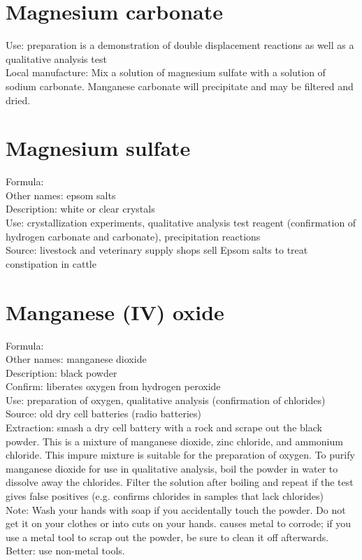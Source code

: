 \section{Magnesium carbonate}
Use: preparation is a demonstration of double displacement reactions 
as well as a qualitative analysis test\\
Local manufacture: Mix a solution of magnesium sulfate 
with a solution of sodium carbonate. 
Manganese carbonate will precipitate and may be filtered and dried.

\section{Magnesium sulfate}
\label{sec:magsulfate}
Formula: \\
Other names: epsom salts\\
Description: white or clear crystals\\
Use: crystallization experiments, 
qualitative analysis test reagent 
(confirmation of hydrogen carbonate and carbonate), 
precipitation reactions\\
Source: livestock and veterinary supply shops sell Epsom salts 
to treat constipation in cattle

\section{Manganese (IV) oxide}
Formula: \\
Other names: manganese dioxide\\
Description: black powder\\
Confirm: liberates oxygen from hydrogen peroxide\\
Use: preparation of oxygen, 
qualitative analysis (confirmation of chlorides)\\
Source: old dry cell batteries (radio batteries)\\
Extraction: smash a dry cell battery with a rock 
and scrape out the black powder. 
This is a mixture of manganese dioxide, 
zinc chloride, 
and ammonium chloride. 
This impure mixture is suitable for the preparation of oxygen. 
To purify manganese dioxide for use in qualitative analysis, 
boil the powder in water to dissolve away the chlorides. 
Filter the solution after boiling 
and repeat if the test gives false positives (e.g. 
confirms chlorides in samples that lack chlorides)\\
Note: Wash your hands with soap if you accidentally touch the powder. 
Do not get it on your clothes or into cuts on your hands. 
 causes metal to corrode; 
if you use a metal tool to scrap out the powder, 
be sure to clean it off afterwards. 
Better: use non-metal tools. 

